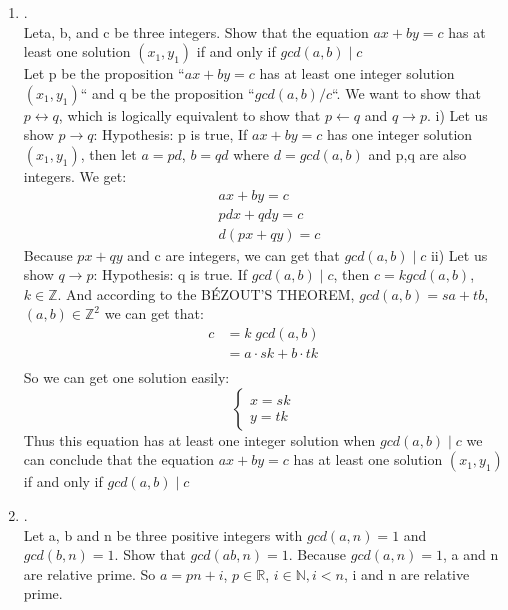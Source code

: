 \documentclass{article}
\theoremstyle{definition}
\theoremstyle{plain}
\begin{document}
\begin {enumerate}[itemindent=30pt,label=\bf Exercise {\arabic*}:]
\subitem \qquad Because both a and b are positive integer, we can only get one set of solution, a = 2, b = 1. 
\newpage
\item .\\Leta, b, and c be three integers. Show that the equation $ax + by = c$ has at least one solution $(x_1,y_1)$ if and only if $gcd(a,b) \mid c$ \\
\subitem Let p be the proposition ``$ax + by = c$ has at least one integer solution $(x_1,y_1)$`` and q be the proposition ``$gcd(a,b) / c$``. We want to show that $p \leftrightarrow q$, which is logically equivalent to show that $p \leftarrow q$ and $q \rightarrow p$.
\subitem i) Let us show $p \rightarrow q$: 
\subitem Hypothesis: p is true, If $ax + by = c$ has one integer solution $(x_1,y_1)$, then let $a = pd$, $b = qd$ where $d = gcd(a,b)$ and p,q are also integers. We get:
\begin{align*}
	&ax + by = c\\
	&pdx + qdy = c\\
	&d(px + qy) = c
\end{align*}
\subitem \qquad Because $px + qy$ and c are integers, we can get that $gcd(a,b) \mid c$
\subitem ii) Let us show $q \rightarrow p$:
\subitem Hypothesis: q is true. If $gcd(a,b) \mid c$, then $c = k gcd(a,b)$, $k \in \mathbb{Z}$. And according to the BÉZOUT’S THEOREM, $gcd(a,b) = sa + tb $, $(a,b) \in \mathbb{Z}^2$ we can get that:
\begin{align*}
	c &= k\; gcd(a,b) \\
	  &= a \cdot sk + b \cdot tk\\	
\end{align*} 
\subitem  So we can get one solution easily:
\begin{equation*}
  \left\{
   \begin{aligned}
   	x = sk\\
   	y = tk
   \end{aligned}
  \right.
\end{equation*}
\subitem Thus this equation has at least one integer solution when $gcd(a,b) \mid c$
\subitem we can conclude that the equation $ax + by = c$ has at least one solution $(x_1,y_1)$ if and only if $gcd(a,b) \mid c$
\item .\\Let a, b and n be three positive integers with $gcd(a,n) = 1$ and $gcd(b,n) = 1$. Show that $gcd(ab,n) = 1$.
\subitem \qquad Because $gcd(a,n) = 1$, a and n are relative prime. \subitem \qquad So $a = pn + i$, $p \in \mathbb{R}$, $i \in \mathbb{N}, i < n$, i and n are relative prime.

\end{enumerate}
\end{document}
